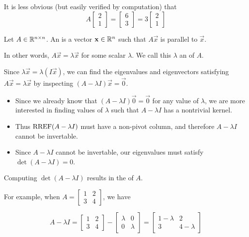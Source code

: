 \begin{applicationActivities}{3}{27}
\begin{observation}
It is less obvious (but easily verified by computation) that
$$A\begin{bmatrix} 2 \\ 1 \end{bmatrix} = \begin{bmatrix} 6 \\ 3 \end{bmatrix} = 3\begin{bmatrix} 2 \\ 1 \end{bmatrix}$$
\end{observation}

\begin{definition}Let $A \in \mathbb{R}^{n \times n}$.
An  is a vector $\mathbf{x} \in \mathbb{R}^n$ such that $A\vec{x}$ is parallel to $\vec{x}$.

In other words, $A\vec{x}=\lambda \vec{x}$ for some scalar $\lambda$.
We call this \(\lambda\) an  of \(A\).
\end{definition}

\begin{observation}
Since \(\lambda\vec x=\lambda (I\vec x)\), we can find the eigenvalues and
eigenvectors satisfying $A\vec{x}=\lambda \vec{x}$ by inspecting
$(A-\lambda I)\vec{x} = \vec0$.
\begin{itemize}
\item Since we already know that $(A-\lambda I)\vec0 = \vec0$
for any value of \(\lambda\),
we are more interested in finding values of $\lambda$ such that
$A-\lambda I$ has a nontrivial kernel.
\item Thus \(\operatorname{RREF}(A-\lambda I)\) must have a non-pivot column, and therefore
\(A-\lambda I\) cannot be invertable.
\item
Since \(A-\lambda I\) cannot be invertable, our eigenvalues must satisfy
\(\det(A-\lambda I)=0\).
\end{itemize}
\end{observation}

\begin{definition}
Computing \(\det(A-\lambda I)\) results in the
 of \(A\).

For example, when
\(A=\begin{bmatrix}1 & 2 \\ 3 & 4\end{bmatrix}\), we have

\[
  A-\lambda I=
  \begin{bmatrix}1 & 2 \\ 3 & 4\end{bmatrix}-
  \begin{bmatrix}\lambda & 0 \\ 0 & \lambda\end{bmatrix}=
  \begin{bmatrix}1-\lambda & 2 \\ 3 & 4-\lambda\end{bmatrix}
\]


\end{definition}
\end{applicationActivities}

